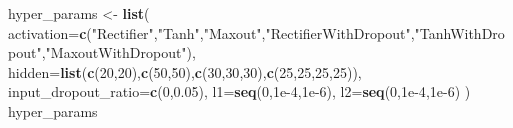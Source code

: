 \documentclass[]{book}
\newenvironment{Shaded}{\begin{snugshade}}{\end{snugshade}}
\newcommand{\DataTypeTok}[1]{\textcolor[rgb]{0.13,0.29,0.53}{#1}}
\newcommand{\DecValTok}[1]{\textcolor[rgb]{0.00,0.00,0.81}{#1}}
\newcommand{\FloatTok}[1]{\textcolor[rgb]{0.00,0.00,0.81}{#1}}
\newcommand{\KeywordTok}[1]{\textcolor[rgb]{0.13,0.29,0.53}{\textbf{#1}}}
\newcommand{\NormalTok}[1]{#1}
\newcommand{\StringTok}[1]{\textcolor[rgb]{0.31,0.60,0.02}{#1}}
\begin{document}
\begin{Shaded}
\begin{Highlighting}[]
\NormalTok{hyper_params <-}\StringTok{ }\KeywordTok{list}\NormalTok{(}
  \DataTypeTok{activation=}\KeywordTok{c}\NormalTok{(}\StringTok{"Rectifier"}\NormalTok{,}\StringTok{"Tanh"}\NormalTok{,}\StringTok{"Maxout"}\NormalTok{,}\StringTok{"RectifierWithDropout"}\NormalTok{,}\StringTok{"TanhWithDropout"}\NormalTok{,}\StringTok{"MaxoutWithDropout"}\NormalTok{),}
  \DataTypeTok{hidden=}\KeywordTok{list}\NormalTok{(}\KeywordTok{c}\NormalTok{(}\DecValTok{20}\NormalTok{,}\DecValTok{20}\NormalTok{),}\KeywordTok{c}\NormalTok{(}\DecValTok{50}\NormalTok{,}\DecValTok{50}\NormalTok{),}\KeywordTok{c}\NormalTok{(}\DecValTok{30}\NormalTok{,}\DecValTok{30}\NormalTok{,}\DecValTok{30}\NormalTok{),}\KeywordTok{c}\NormalTok{(}\DecValTok{25}\NormalTok{,}\DecValTok{25}\NormalTok{,}\DecValTok{25}\NormalTok{,}\DecValTok{25}\NormalTok{)),}
  \DataTypeTok{input_dropout_ratio=}\KeywordTok{c}\NormalTok{(}\DecValTok{0}\NormalTok{,}\FloatTok{0.05}\NormalTok{),}
  \DataTypeTok{l1=}\KeywordTok{seq}\NormalTok{(}\DecValTok{0}\NormalTok{,}\FloatTok{1e-4}\NormalTok{,}\FloatTok{1e-6}\NormalTok{),}
  \DataTypeTok{l2=}\KeywordTok{seq}\NormalTok{(}\DecValTok{0}\NormalTok{,}\FloatTok{1e-4}\NormalTok{,}\FloatTok{1e-6}\NormalTok{)}
\NormalTok{)}
\NormalTok{hyper_params}


\end{Highlighting}
\end{Shaded}
\end{document}

